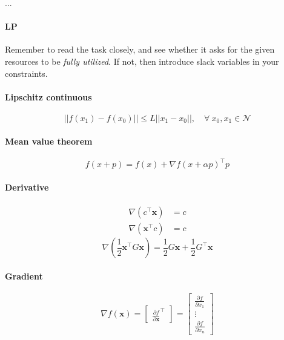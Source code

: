
...

\sepline

\paragraph{LP}
Remember to read the task closely, and see whether it asks for the given resources to be \textit{fully utilized}. If not, then introduce slack variables in your constraints.


\paragraph{Lipschitz continuous}
\begin{equation}
  || f(x_1) - f(x_0) || \leq L || x_1 - x_0 ||, \quad \forall \: x_0, x_1 \in \mathcal{N}
\end{equation}

\paragraph{Mean value theorem}
\begin{equation}
  f(x+p) = f(x) + \nabla f(x + \alpha p)^\top p
\end{equation}


\paragraph{Derivative}
\begin{equation}
\begin{split}
  \nabla(c^\top \mathbf{x}) &= c\\
  \nabla(\mathbf{x}^\top c) &= c
\end{split}
\end{equation}
%
\begin{equation}
  \nabla \left( \frac{1}{2} \mathbf{x}^\top G \mathbf{x} \right) = \frac{1}{2}G \mathbf{x} + \frac{1}{2}G^\top \mathbf{x}
\end{equation}

\paragraph{Gradient}
\begin{equation}
  \nabla f(\mathbf{x}) = \begin{bmatrix} \frac{\partial f}{\partial \mathbf{x}}^\top \end{bmatrix}
  = \begin{bmatrix}
  \frac{\partial f}{\partial x_1}\\
  \vdots\\
  \frac{\partial f}{\partial x_n}
  \end{bmatrix}
\end{equation}

